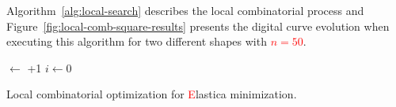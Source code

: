 \documentclass[smallextended]{svjour3}       %
\newcommand{\revision}[1]{\textcolor{red}{#1}}
\begin{document}
Algorithm~\ref{alg:local-search} describes the local combinatorial process and Figure~\ref{fig:local-comb-square-results} presents the digital curve evolution when executing this algorithm for two different shapes with \revision{$n=50$}.


\begin{algorithm}
 
 \BlankLine
 \Delta $\longleftarrow$ \Tol+1\;
 $i \longleftarrow 0$\;
 \caption{Local combinatorial optimization for \revision{E}lastica minimization.}
 \label{alg:local-search} 
\end{algorithm}
\end{document}
